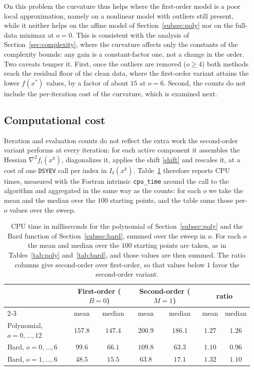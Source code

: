 \documentclass[11pt]{article}
\newcounter{alg}[section]
\begin{document}
On this problem the curvature thus helps where the first-order model is a poor
local approximation, namely on a nonlinear model with outliers still present,
while it neither helps on the affine model of Section~\ref{subsec:poly} nor on the
full-data minimax at $o = 0$. This is consistent with the analysis of
Section~\ref{sec:complexity}, where the curvature affects only the constants of
the complexity bounds: any gain is a constant-factor one, not a change in the
order. Two caveats temper it. First, once the outliers are removed ($o \ge 4$)
both methods reach the residual floor of the clean data, where the first-order
variant attains the lower $f(x^*)$ values, by a factor of about $15$ at $o = 6$.
Second, the counts do not include the per-iteration cost of the curvature,
which is examined next.

\subsection{Computational cost} \label{subsec:time}

Iteration and evaluation counts do not reflect the extra work the second-order
variant performs at every iteration: for each active component it assembles the
Hessian $\nabla^2 f_i(x^k)$, diagonalizes it, applies the shift \eqref{shift}
and rescales it, at a cost of one \texttt{DSYEV} call per index in
$I_\delta(x^k)$. Table~\ref{tab:time} therefore reports CPU times, measured with
the Fortran intrinsic \texttt{cpu\_time} around the call to the algorithm and
aggregated in the same way as the counts: for each $o$ we take the mean and the
median over the $100$ starting points, and the table sums those per-$o$ values
over the sweep.

\begin{table}[ht!]
\centering
\begin{tabular}{l cc cc cc}
\hline
 & \multicolumn{2}{c}{First-order ($B=0$)}
 & \multicolumn{2}{c}{Second-order ($M=1$)}
 & \multicolumn{2}{c}{ratio} \\
\cline{2-3}\cline{4-5}\cline{6-7}
 & mean & median & mean & median & mean & median \\
\hline
Polynomial, $o=0,\dots,12$
  & $157.8$ & $147.4$ & $200.9$ & $186.1$ & $1.27$ & $1.26$ \\
Bard, $o=0,\dots,6$
  & $99.6$ & $66.1$ & $109.8$ & $63.3$ & $1.10$ & $0.96$ \\
Bard, $o=1,\dots,6$
  & $48.5$ & $15.5$ & $63.8$ & $17.1$ & $1.32$ & $1.10$ \\
\hline
\end{tabular}
\caption{CPU time in milliseconds for the polynomial of
Section~\ref{subsec:poly} and the Bard function of Section~\ref{subsec:bard},
summed over the sweep in $o$. For each $o$
the mean and median over the $100$ starting points are taken, as in
Tables~\ref{tab:poly} and~\ref{tab:bard}, and those values are then summed. The
ratio columns give second-order over first-order, so that values below $1$
favor the second-order variant.}
\label{tab:time}
\end{table}
\end{document}

